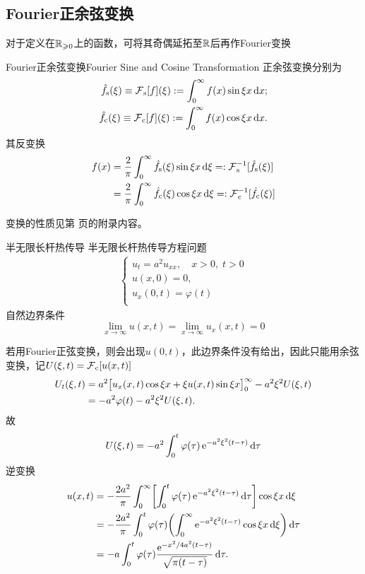 \subsection{Fourier正余弦变换}
对于定义在$\mathbb{R}_{\geqslant  0}$上的函数，可将其奇偶延拓至$\mathbb{R}$后再作Fourier变换
\begin{definition}{Fourier正余弦变换}{Fourier Sine and Cosine Transformation}
	正余弦变换分别为
	\begin{subequations}
		\label{eq:mmp-sine-cosine-transforms}
		\begin{align}
			\hat f_\mathrm s(\xi) \equiv \operatorname{\mathcal{F}}_\mathrm s[f](\xi) := \int_0^\infty f(x)\sin\xi x\mathop{}\!\mathrm{d} x;\\
			\hat f_\mathrm c(\xi) \equiv \operatorname{\mathcal{F}}_\mathrm c[f](\xi) := \int_0^\infty f(x)\cos\xi x\mathop{}\!\mathrm{d} x.
		\end{align}
	\end{subequations}
	其反变换
	\begin{equation}
		\label{eq:mmp-inverse-half-range-transforms}
		\begin{aligned}
			f(x) &= \frac2\pi\int_0^\infty\hat f_\mathrm s(\xi)\sin\xi x\mathop{}\!\mathrm{d}\xi =: \operatorname{\mathcal{F}}_\mathrm s^{-1}[\hat f_\mathrm s(\xi)]\\
			&= \frac2\pi\int_0^\infty\hat f_\mathrm c(\xi)\cos\xi x\mathop{}\!\mathrm{d}\xi =: \operatorname{\mathcal{F}}_\mathrm c^{-1}[\hat f_\mathrm c(\xi)]
		\end{aligned}
	\end{equation}
\end{definition}
变换的性质见第 \pageref{The Property of Sine and Cosine Transformation} 页的附录内容。
\begin{example}{半无限长杆热传导}{}
	半无限长杆热传导方程问题
	\begin{align*}
		\begin{cases}
			u_t = a^2u_{xx},\quad x > 0,\;t > 0\\
			u(x,0) = 0,\\
			u_x(0,t) = \varphi(t)\\
		\end{cases}
	\end{align*}
	自然边界条件
	\[
		\lim_{x\to\infty}u(x,t) = \lim_{x\to\infty}u_x(x,t) = 0
	\]
	
	若用Fourier正弦变换，则会出现$u(0,t)$，此边界条件没有给出，因此只能用余弦变换，记$U(\xi,t) = \operatorname{\mathcal{F}}_\mathrm c[u(x,t)]$
	\begin{align*}
		U_t(\xi,t) &= a^2\bigl[u_x(x,t)\cos\xi x + \xi u(x,t)\sin\xi x\bigr]_0^\infty - a^2\xi^2U(\xi,t)\\
		&= -a^2\varphi(t) - a^2\xi^2U(\xi,t).
	\end{align*}
	故
	\[
		U(\xi,t) = -a^2\int_0^t\varphi(\tau)\mathop{}\!\mathrm{e}^{-a^2\xi^2(t-\tau)}\mathop{}\!\mathrm{d}\tau
	\]
	逆变换
	\begin{align}
		u(x,t) &= -\frac{2a^2}\pi\intRplus\biggb{\int_0^t\varphi(\tau)\e^{-a^2\xi^2(t-\tau)}\d\tau}\cos\xi x\d\xi\notag\\
		&= -\frac{2a^2}\pi\int_0^t\varphi(\tau)\biggp{\intRplus\e^{-a^2\xi^2(t-\tau)}\cos\xi x\d\xi}\d\tau\notag\\
		&= -a\int_0^t\varphi(\tau)\frac{\e^{-x^2/4a^2(t-\tau)}}{\sqrt{\pi(t - \tau)}}\d\tau.\label{eq:mmp-half-line-heat-flux}
	\end{align}
\end{example}

